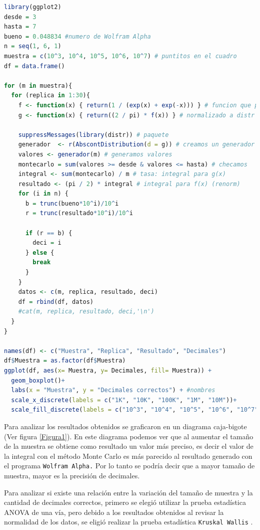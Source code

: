 \documentclass{article}
\begin{document}
\lstset{style=mystyle}
\begin{lstlisting}[language=R, caption= Código para obtener la cantidad de decimales que coinciden al comparar el valor de la integral \eqref{integral} calculado con el método Monte Carlo y el valor que se obtiene con el programa \texttt{Wolfram Alpha}.]
library(ggplot2)
desde = 3
hasta = 7
bueno = 0.048834 #numero de Wolfram Alpha
n = seq(1, 6, 1)
muestra = c(10^3, 10^4, 10^5, 10^6, 10^7) # puntitos en el cuadro
df = data.frame()

for (m in muestra){
  for (replica in 1:30){
    f <- function(x) { return(1 / (exp(x) + exp(-x))) } # funcion que piden
    g <- function(x) { return((2 / pi) * f(x)) } # normalizado a distr
    
    suppressMessages(library(distr)) # paquete
    generador  <- r(AbscontDistribution(d = g)) # creamos un generador
    valores <- generador(m) # generamos valores
    montecarlo = sum(valores >= desde & valores <= hasta) # checamos
    integral <- sum(montecarlo) / m # tasa: integral para g(x)
    resultado <- (pi / 2) * integral # integral para f(x) (renorm)
    for (i in n) {
      b = trunc(bueno*10^i)/10^i
      r = trunc(resultado*10^i)/10^i
      
      if (r == b) {
        deci = i
      } else {
        break
      }
    }
    datos <- c(m, replica, resultado, deci)
    df = rbind(df, datos)
    #cat(m, replica, resultado, deci,'\n')
  }
}

names(df) <- c("Muestra", "Replica", "Resultado", "Decimales")
df$Muestra = as.factor(df$Muestra)
ggplot(df, aes(x= Muestra, y= Decimales, fill= Muestra)) + 
  geom_boxplot()+
  labs(x = "Muestra", y = "Decimales correctos") + #nombres
  scale_x_discrete(labels = c("1K", "10K", "100K", "1M", "10M"))+
  scale_fill_discrete(labels = c("10^3", "10^4", "10^5", "10^6", "10^7"))
\end{lstlisting}

Para analizar los resultados obtenidos se graficaron en un diagrama caja-bigote (Ver figura \ref{Figura1}). En este diagrama podemos ver que al aumentar el tamaño de la muestra se obtiene como resultado un valor más preciso, es decir el valor de la integral con el método Monte Carlo es más parecido al resultado generado con el programa \texttt{Wolfram Alpha.} Por lo tanto se podría decir que a mayor tamaño de muestra, mayor es la precisión de decimales. 
\bigskip

Para analizar si existe una relación entre la variación del tamaño de muestra y la cantidad de decimales correctos, primero se elegió utilizar la prueba estadística ANOVA de una vía, pero debido a los resultados obtenidos al revisar la normalidad de los datos, se eligió realizar la prueba estadística \texttt{Kruskal Wallis} \citep{2}.
\bigskip
\end{document}

